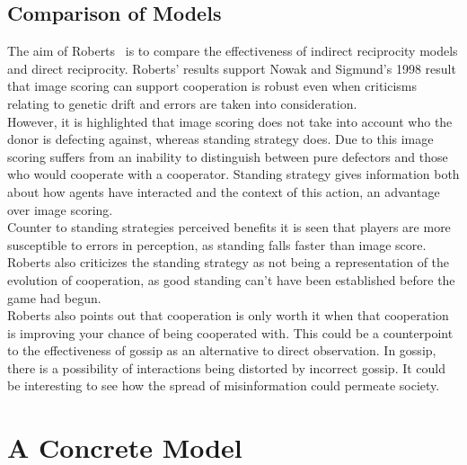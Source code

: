 \documentclass[twoside,twocolumn]{article}
\begin{document}
\subsection{Comparison of Models}
The aim of Roberts~\cite{evoldirindir} is to compare the effectiveness of indirect reciprocity models and direct reciprocity. Roberts' results support Nowak and Sigmund's 1998 result that image scoring can support cooperation is robust even when criticisms relating to genetic drift and errors are taken into consideration.\\
However, it is highlighted that image scoring does not take into account who the donor is defecting against, whereas standing strategy does. Due to this image scoring suffers from an inability to distinguish between pure defectors and those who would cooperate with a cooperator. Standing strategy gives information both about how agents have interacted and the context of this action, an advantage over image scoring.\\
Counter to standing strategies perceived benefits it is seen that players are more susceptible to errors in perception, as standing falls faster than image score. Roberts also criticizes the standing strategy as not being a representation of the evolution of cooperation, as good standing can't have been established before the game had begun.\\
Roberts also points out that cooperation is only worth it when that cooperation is improving your chance of being cooperated with. This could be a counterpoint to the effectiveness of gossip as an alternative to direct observation. In gossip, there is a possibility of interactions being distorted by incorrect gossip. It could be interesting to see how the spread of misinformation could permeate society.


\section{A Concrete Model}
\end{document}
